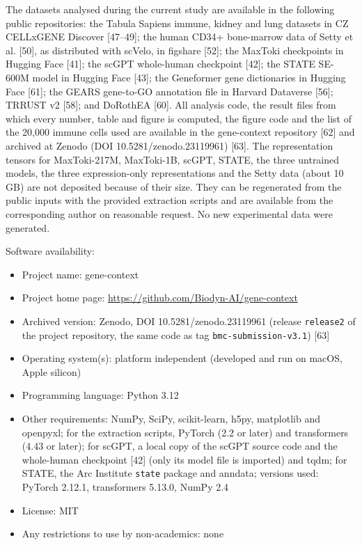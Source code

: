 \documentclass[
  11pt,
]{article}
\newcounter{none} %
\providecommand{\tightlist}{%
  \setlength{\itemsep}{0pt}\setlength{\parskip}{0pt}}
\begin{document}
The datasets analysed during the current study are available in the
following public repositories: the Tabula Sapiens immune, kidney and
lung datasets in CZ CELLxGENE Discover {[}47--49{]}; the human CD34+
bone-marrow data of Setty et al. {[}50{]}, as distributed with scVelo,
in figshare {[}52{]}; the MaxToki checkpoints in Hugging Face {[}41{]};
the scGPT whole-human checkpoint {[}42{]}; the STATE SE-600M model in
Hugging Face {[}43{]}; the Geneformer gene dictionaries in Hugging Face
{[}61{]}; the GEARS gene-to-GO annotation file in Harvard Dataverse
{[}56{]}; TRRUST v2 {[}58{]}; and DoRothEA {[}60{]}. All analysis code,
the result files from which every number, table and figure is computed,
the figure code and the list of the 20,000 immune cells used are
available in the gene-context repository {[}62{]} and archived at Zenodo
(DOI 10.5281/zenodo.23119961) {[}63{]}. The representation tensors for
MaxToki-217M, MaxToki-1B, scGPT, STATE, the three untrained models, the
three expression-only representations and the Setty data (about 10 GB)
are not deposited because of their size. They can be regenerated from
the public inputs with the provided extraction scripts and are available
from the corresponding author on reasonable request. No new experimental
data were generated.

Software availability:

\begin{itemize}
\tightlist
\item
  Project name: gene-context
\item
  Project home page: \url{https://github.com/Biodyn-AI/gene-context}
\item
  Archived version: Zenodo, DOI 10.5281/zenodo.23119961 (release
  \texttt{release2} of the project repository, the same code as tag
  \texttt{bmc-submission-v3.1}) {[}63{]}
\item
  Operating system(s): platform independent (developed and run on macOS,
  Apple silicon)
\item
  Programming language: Python 3.12
\item
  Other requirements: NumPy, SciPy, scikit-learn, h5py, matplotlib and
  openpyxl; for the extraction scripts, PyTorch (2.2 or later) and
  transformers (4.43 or later); for scGPT, a local copy of the scGPT
  source code and the whole-human checkpoint {[}42{]} (only its model
  file is imported) and tqdm; for STATE, the Arc Institute
  \texttt{state} package and anndata; versions used: PyTorch 2.12.1,
  transformers 5.13.0, NumPy 2.4
\item
  License: MIT
\item
  Any restrictions to use by non-academics: none
\end{itemize}
\end{document}
